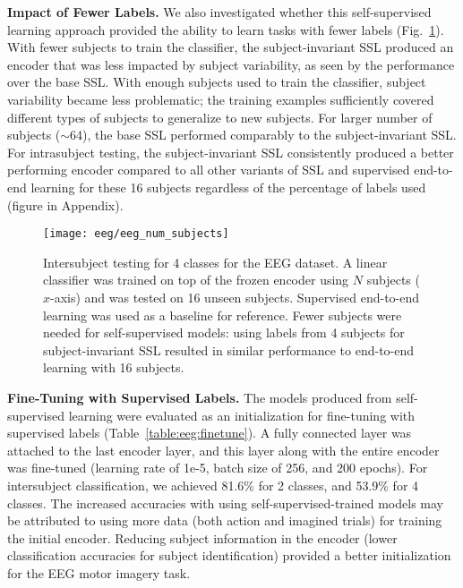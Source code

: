 \documentclass{article}
\renewcommand{\paragraph}[1]{\textbf{#1}\hspace{1em}}
\begin{document}
\paragraph{Impact of Fewer Labels.}
We also investigated whether this self-supervised learning approach provided the
ability to learn tasks with fewer labels (Fig.~\ref{fig:eeg:labels}). With fewer
subjects to train the classifier, the subject-invariant SSL produced an encoder
that was less impacted by subject variability, as seen by the performance over
the base SSL. With enough subjects used to train the classifier, subject
variability became less problematic; the training examples sufficiently covered
different types of subjects to generalize to new subjects. For larger number of
subjects ($\sim$64), the base SSL performed comparably to the subject-invariant
SSL. For intrasubject testing, the subject-invariant SSL consistently produced a
better performing encoder compared to all other variants of SSL and supervised
end-to-end learning for these 16 subjects regardless of the percentage of labels
used (figure in Appendix).

\begin{figure}
  \begin{minipage}[c]{0.49\textwidth}
    \texttt{[image: eeg/eeg\_num\_subjects]}
  \end{minipage}
  \hfill
  \begin{minipage}[c]{0.5\textwidth}
    \caption{Intersubject testing for 4 classes for the EEG dataset. A linear
    classifier was trained on top of the frozen encoder using $N$ subjects
    ($x$-axis) and was tested on 16 unseen subjects. Supervised end-to-end
    learning was used as a baseline for reference. Fewer subjects were needed
    for self-supervised models: using labels from 4 subjects for
    subject-invariant SSL resulted in similar performance to end-to-end learning
    with 16 subjects.}
    \label{fig:eeg:labels}
  \end{minipage}
\end{figure}

\paragraph{Fine-Tuning with Supervised Labels.}
The models produced from self-supervised learning were evaluated as an
initialization for fine-tuning with supervised labels
(Table~\ref{table:eeg:finetune}). A fully connected layer was attached to the
last encoder layer, and this layer along with the entire encoder was fine-tuned
(learning rate of 1e-5, batch size of 256, and 200 epochs). For intersubject
classification, we achieved 81.6\% for 2 classes, and 53.9\% for 4 classes.
The increased accuracies with using self-supervised-trained models may be
attributed to using more data (both action and imagined trials) for training the
initial encoder.  Reducing subject information in the encoder (lower
classification accuracies for subject identification) provided a better
initialization for the EEG motor imagery task.
\end{document}
